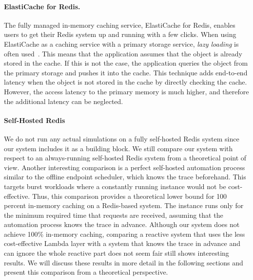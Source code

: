 
\paragraph{ElastiCache for Redis.}
The fully managed in-memory caching service, ElastiCache for Redis, enables users to get their Redis system up and running with a few clicks. When using ElastiCache as a caching service with a primary storage service, \emph{lazy loading} is often used~\cite{noauthor_turbocharge_2019}. This means that the application assumes that the object is already stored in the cache. If this is not the case, the application queries the object from the primary storage and pushes it into the cache. This technique adds end-to-end latency when the object is not stored in the cache by directly checking the cache. However, the access latency to the primary memory is much higher, and therefore the additional latency can be neglected.

\paragraph{Self-Hosted Redis}
We do not run any actual simulations on a fully self-hosted Redis system since our system includes it as a building block. We still compare our system with respect to an always-running self-hosted Redis system from a theoretical point of view. Another interesting comparison is a perfect self-hosted automation process similar to the offline endpoint scheduler, which knows the trace beforehand. This targets burst workloads where a constantly running instance would not be cost-effective. Thus, this comparison provides a theoretical lower bound for 100 percent in-memory caching on a Redis-based system. The instance runs only for the minimum required time that requests are received, assuming that the automation process knows the trace in advance. Although our system does not achieve 100\% in-memory caching, comparing a reactive system that uses the less cost-effective Lambda layer with a system that knows the trace in advance and can ignore the whole reactive part does not seem fair still shows interesting results. We will discuss these results in more detail in the following sections and present this comparison from a theoretical perspective. 

